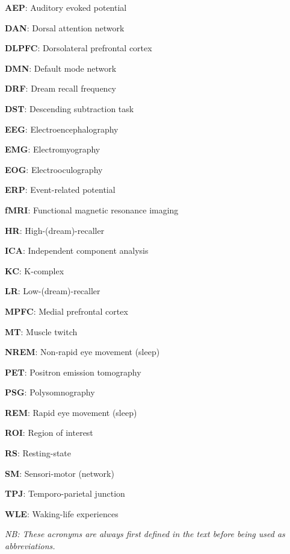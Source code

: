 \label{sec:acronyms}
\vspace*{-10mm}
\setlength{\columnsep}{1.5cm}
\begin{multicols}{2}

\textbf{AEP}: Auditory evoked potential

\textbf{DAN}: Dorsal attention network

\textbf{DLPFC}: Dorsolateral prefrontal cortex

\textbf{DMN}: Default mode network

\textbf{DRF}: Dream recall frequency

\textbf{DST}: Descending subtraction task

\textbf{EEG}: Electroencephalography

\textbf{EMG}: Electromyography

\textbf{EOG}: Electrooculography

\textbf{ERP}: Event-related potential

\textbf{fMRI}: Functional magnetic resonance imaging

\textbf{HR}: High-(dream)-recaller

\textbf{ICA}: Independent component analysis

\textbf{KC}: K-complex

\textbf{LR}: Low-(dream)-recaller

\textbf{MPFC}: Medial prefrontal cortex

\textbf{MT}: Muscle twitch

\textbf{NREM}: Non-rapid eye movement (sleep)

\textbf{PET}: Positron emission tomography

\textbf{PSG}: Polysomnography

\textbf{REM}: Rapid eye movement (sleep)

\textbf{ROI}: Region of interest

\textbf{RS}: Resting-state

\textbf{SM}: Sensori-motor (network)

\textbf{TPJ}: Temporo-parietal junction

\textbf{WLE}: Waking-life experiences
\end{multicols}

\textit{NB: These acronyms are always first defined in the text before being used as abbreviations.}
